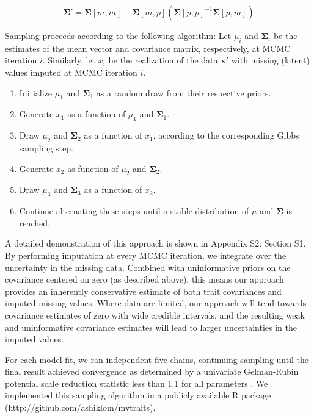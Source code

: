 \documentclass{article}
\begin{document}
\begin{equation}
\bm{\Sigma\prime} = \bm{\Sigma}[m,m] -
\bm{\Sigma}[m,p]
(\bm{\Sigma}[p,p]^{-1} \bm{\Sigma}[p,m])
\end{equation}

Sampling proceeds according to the following algorithm:
Let $\mu_i$ and $\bm{\Sigma}_i$ be the estimates of the mean vector and covariance matrix, respectively, at MCMC iteration $i$.
Similarly, let $x_i$ be the realization of the data $\bm{x}\prime$ with missing (latent) values imputed at MCMC iteration $i$.

\begin{enumerate}
\item Initialize $\mu_1$ and $\bm{\Sigma}_1$ as a random draw from their respective priors.
\item Generate $x_1$ as a function of $\mu_1$ and $\bm{\Sigma}_1$.
\item Draw $\mu_2$ and $\bm{\Sigma}_2$ as a function of $x_1$, according to the corresponding Gibbs sampling step.
\item Generate $x_2$ as function of $\mu_2$ and $\bm{\Sigma}_2$.
\item Draw $\mu_3$ and $\bm{\Sigma}_3$ as a function of $x_2$.
\item Continue alternating these steps until a stable distribution of $\mu$ and $\bm{\Sigma}$ is reached.
\end{enumerate}

A detailed demonstration of this approach is shown in Appendix S2: Section S1.
By performing imputation at every MCMC iteration, we integrate over the uncertainty in the missing data.
Combined with uninformative priors on the covariance centered on zero (as described above),
this means our approach provides an inherently conservative estimate of both trait covariances and imputed missing values.
Where data are limited, our approach will tend towards covariance estimates of zero with wide credible intervals,
and the resulting weak and uninformative covariance estimates will lead to larger uncertainties in the imputed values.

For each model fit, we ran independent five chains, continuing sampling until the final result achieved convergence as determined by a univariate Gelman-Rubin potential scale reduction statistic less than 1.1 for all parameters \citep{gelman_1992_inference}.
We implemented this sampling algorithm in a publicly available R \citep{r_361} package (http://github.com/ashiklom/mvtraits).
\end{document}
